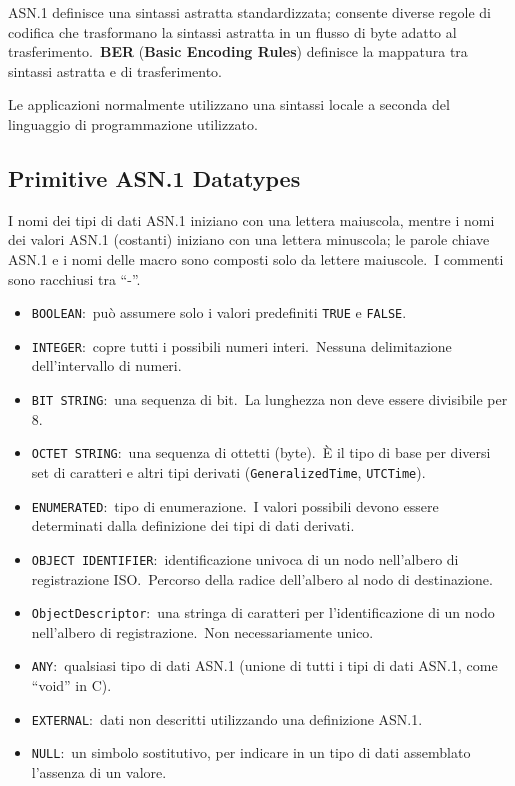 \noindent ASN.1 definisce una sintassi astratta standardizzata; consente diverse regole di codifica che trasformano la sintassi astratta in un flusso di byte adatto al trasferimento.\
\textbf{BER} (\textbf{Basic Encoding Rules}) definisce la mappatura tra sintassi astratta e di trasferimento.\

Le applicazioni normalmente utilizzano una sintassi locale a seconda del linguaggio di programmazione utilizzato.

\subsection{Primitive ASN.1 Datatypes}

I nomi dei tipi di dati ASN.1 iniziano con una lettera maiuscola, mentre i nomi dei valori ASN.1 (costanti) iniziano con una lettera minuscola; le parole chiave ASN.1 e i nomi delle macro sono composti solo da lettere maiuscole.\
I commenti sono racchiusi tra ``-''.

\begin{itemize}
    \item \texttt{BOOLEAN}:\ può assumere solo i valori predefiniti \texttt{TRUE} e \texttt{FALSE}.
    \item \texttt{INTEGER}:\ copre tutti i possibili numeri interi.\ Nessuna delimitazione dell'intervallo di numeri.
    \item \texttt{BIT STRING}:\ una sequenza di bit.\ La lunghezza non deve essere divisibile per 8.
    \item \texttt{OCTET STRING}:\ una sequenza di ottetti (byte).\ È il tipo di base per diversi set di caratteri e altri tipi derivati (\texttt{GeneralizedTime}, \texttt{UTCTime}).
    \item \texttt{ENUMERATED}:\ tipo di enumerazione.\ I valori possibili devono essere determinati dalla definizione dei tipi di dati derivati.
    \item \texttt{OBJECT IDENTIFIER}:\ identificazione univoca di un nodo nell'albero di registrazione ISO.\ Percorso della radice dell'albero al nodo di destinazione.
    \item \texttt{ObjectDescriptor}:\ una stringa di caratteri per l'identificazione di un nodo nell'albero di registrazione.\ Non necessariamente unico.
    \item \texttt{ANY}:\ qualsiasi tipo di dati ASN.1 (unione di tutti i tipi di dati ASN.1, come ``void'' in C).
    \item \texttt{EXTERNAL}:\ dati non descritti utilizzando una definizione ASN.1.
    \item \texttt{NULL}:\ un simbolo sostitutivo, per indicare in un tipo di dati assemblato l'assenza di un valore.
\end{itemize}

